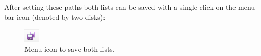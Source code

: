 After setting these paths both lists can be saved with a single click on the menu-bar icon (denoted by two disks):

\begin{figure}[H]
\begin{center}
\includegraphics[scale=1]{gfx/save_both_lists.png}
\caption{Menu icon to save both lists.}
\label{fig:save_both_lists}
\end{center}
\end{figure}
